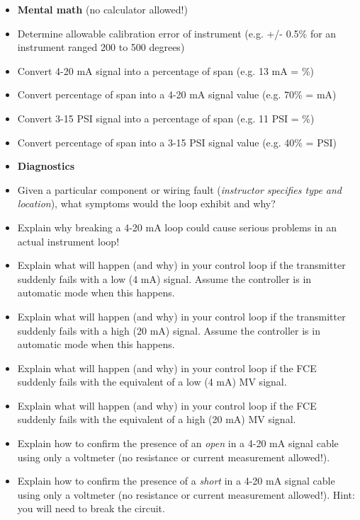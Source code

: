 \documentclass[12pt,a4paper]{article}
\begin{document}
\filbreak

\begin{itemize}
\item{} {\bf Mental math} (no calculator allowed!)
\item{} Determine allowable calibration error of instrument (e.g. +/- 0.5\% for an instrument ranged 200 to 500 degrees)
\item{} Convert 4-20 mA signal into a percentage of span (e.g. 13 mA = \underbar{\hskip 20pt}\%)
\item{} Convert percentage of span into a 4-20 mA signal value (e.g. 70\% = \underbar{\hskip 20pt} mA)
\item{} Convert 3-15 PSI signal into a percentage of span (e.g. 11 PSI = \underbar{\hskip 20pt}\%)
\item{} Convert percentage of span into a 3-15 PSI signal value (e.g. 40\% = \underbar{\hskip 20pt} PSI)
\end{itemize}

\filbreak

\begin{itemize}
\item{} {\bf Diagnostics}
\item{} Given a particular component or wiring fault ({\it instructor specifies type and location}), what symptoms would the loop exhibit and why?
\item{} Explain why breaking a 4-20 mA loop could cause serious problems in an actual instrument loop!
\item{} Explain what will happen (and why) in your control loop if the transmitter suddenly fails with a low (4 mA) signal.  Assume the controller is in automatic mode when this happens.
\item{} Explain what will happen (and why) in your control loop if the transmitter suddenly fails with a high (20 mA) signal.  Assume the controller is in automatic mode when this happens.
\item{} Explain what will happen (and why) in your control loop if the FCE suddenly fails with the equivalent of a low (4 mA) MV signal.
\item{} Explain what will happen (and why) in your control loop if the FCE suddenly fails with the equivalent of a high (20 mA) MV signal.
\item{} Explain how to confirm the presence of an {\it open} in a 4-20 mA signal cable using only a voltmeter (no resistance or current measurement allowed!). 
\item{} Explain how to confirm the presence of a {\it short} in a 4-20 mA signal cable using only a voltmeter (no resistance or current measurement allowed!).  Hint: you will need to break the circuit. 
\end{itemize}
\end{document}

